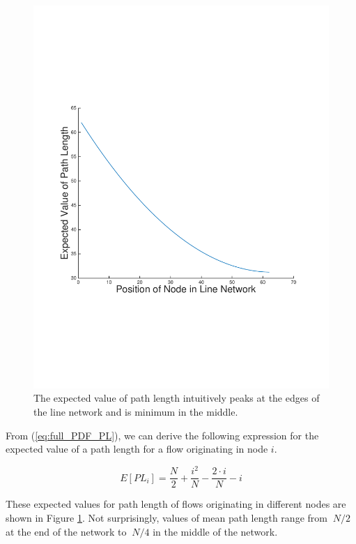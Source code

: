 \begin{figure}
\begin{centering}
    \includegraphics[scale=0.4, clip=true, trim=15mm 65mm 20mm 65mm]{figures/EV_PL_line_net_125.pdf}
    \caption{The expected value of path length intuitively peaks at the edges of the line network and is minimum in the middle.}
    \label{fig:mean_PL_each_node_line_net}
\end{centering}
\end{figure}

From (\ref{eq:full_PDF_PL}), we can derive the following expression for the expected value of a path length for a flow originating in node $i$.

\begin{equation}
	E[PL_i] = \frac{N}{2} + \frac{i^2}{N} - \frac{2 \cdot i}{N} - i
\end{equation}

These expected values for path length of flows originating in different nodes are shown in Figure \ref{fig:mean_PL_each_node_line_net}.  Not surprisingly, values of mean path length range from $~N/2$ at the end of the network to $~N/4$ in the middle of the network.  



